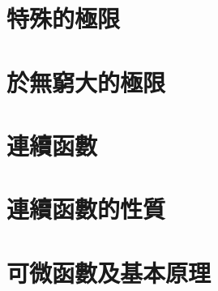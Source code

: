 \documentclass[12pt]{article}
\begin{document}
    \section*{特殊的極限}
    \section*{於無窮大的極限}
    \section*{連續函數}
    \section*{連續函數的性質}
    \section*{可微函數及基本原理}
\end{document}

